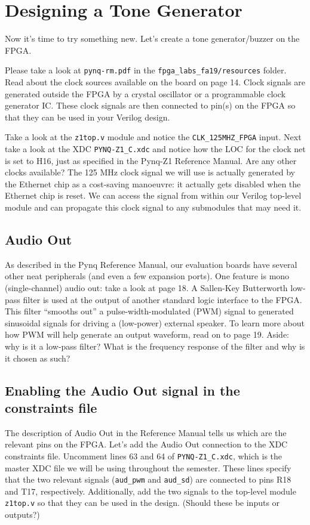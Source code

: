 \documentclass[11pt]{article}
\newcommand{\RepoRootPath}{fpga\_labs\_fa19}
\begin{document}
\section{Designing a Tone Generator}
Now it's time to try something new. Let's create a tone generator/buzzer on the FPGA.

Please take a look at \verb|pynq-rm.pdf| in the \texttt{\RepoRootPath/resources} folder.
Read about the clock sources available on the board on page 14.
Clock signals are generated outside the FPGA by a crystal oscillator or a programmable clock generator IC.
These clock signals are then connected to pin(s) on the FPGA so that they can be used in your Verilog design.

Take a look at the \verb|z1top.v| module and notice the \verb|CLK_125MHZ_FPGA| input. Next take a look at the XDC \verb|PYNQ-Z1_C.xdc| and notice how the LOC for the clock net is set to H16, just as specified in the Pynq-Z1 Reference Manual. Are any other clocks available? The 125 MHz clock signal we will use is actually generated by the Ethernet chip as a cost-saving manoeuvre: it actually gets disabled when the Ethernet chip is reset. We can access the signal from within our Verilog top-level module and can propagate this clock signal to any submodules that may need it.

\subsection{Audio Out}

As described in the Pynq Reference Manual, our evaluation boards have several other neat peripherals (and even a few expansion ports). One feature is mono (single-channel) audio out: take a look at page 18. A Sallen-Key Butterworth low-pass filter is used at the output of another standard logic interface to the FPGA. This filter ``smooths out'' a pulse-width-modulated (PWM) signal to generated sinusoidal signals for driving a (low-power) external speaker. To learn more about how PWM will help generate an output waveform, read on to page 19. Aside: why is it a low-pass filter? What is the frequency response of the filter and why is it chosen as such?

\subsection{Enabling the Audio Out signal in the constraints file}

The description of Audio Out in the Reference Manual tells us which are the relevant pins on the FPGA. Let's add the Audio Out connection to the XDC constraints file. Uncomment lines 63 and 64 of \verb|PYNQ-Z1_C.xdc|, which is the master XDC file we will be using throughout the semester. These lines specify that the two relevant signals (\verb|aud_pwm| and \verb|aud_sd|) are connected to pins R18 and T17, respectively. Additionally, add the two signals to the top-level module \verb|z1top.v| so that they can be used in the design. (Should these be inputs or outputs?)
\end{document}
